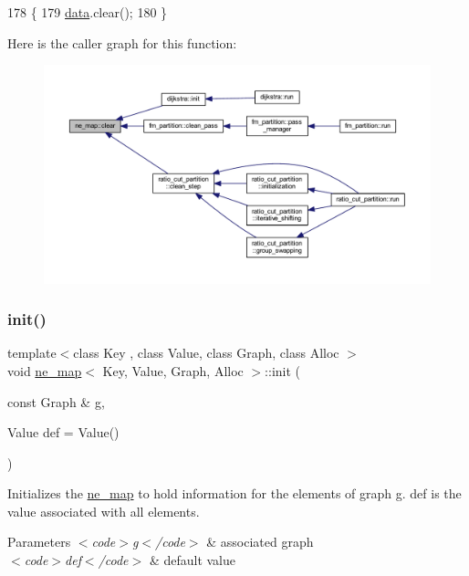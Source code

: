 \begin{DoxyCode}
178 \{
179     \mbox{\hyperlink{classne__map_af73307678e05a9c24c084d98b267afa8}{data}}.clear();
180 \}
\end{DoxyCode}
Here is the caller graph for this function\+:\nopagebreak
\begin{figure}[H]
\begin{center}
\leavevmode
\includegraphics[width=350pt]{classne__map_aebe555c23769c6dcc869b5ac7fae6a9c_icgraph}
\end{center}
\end{figure}
\mbox{\label{classne__map_a4ef2ab4aebcb57a7a101975bf6a88e24}} 
\subsubsection{\texorpdfstring{init()}{init()}}
{\footnotesize\ttfamily template$<$class Key , class Value, class Graph, class Alloc $>$ \\
void \mbox{\hyperlink{classne__map}{ne\+\_\+map}}$<$ Key, Value, Graph, Alloc $>$\+::init (\begin{DoxyParamCaption}\item[{const Graph \&}]{g,  }\item[{Value}]{def = {\ttfamily Value()} }\end{DoxyParamCaption})}

Initializes the \mbox{\hyperlink{classne__map}{ne\+\_\+map}} to hold information for the elements of graph g. def is the value associated with all elements.


\begin{DoxyParams}{Parameters}
{\em $<$code$>$g$<$/code$>$} & associated {\ttfamily graph} \\
\hline
{\em $<$code$>$def$<$/code$>$} & default value \\
\hline
\end{DoxyParams}


